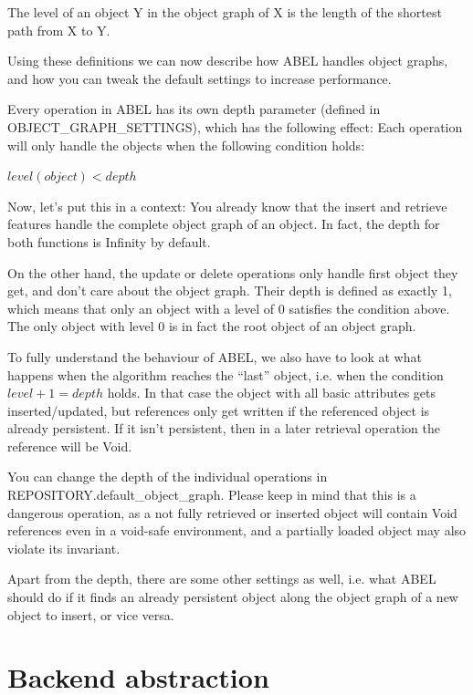 The level of an object Y in the object graph of X is the length of the shortest path from X to Y.

Using these definitions we can now describe how ABEL handles object graphs, and how you can tweak the default settings to increase performance.

Every operation in ABEL has its own depth parameter (defined in OBJECT\_GRAPH\_SETTINGS), which has the following effect:
Each operation will only handle the objects when the following condition holds:

\begin{center}
 $ level(object) < depth $ %
\end{center}

Now, let's put this in a context:
You already know that the insert and retrieve features handle the complete object graph of an object. 
In fact, the depth for both functions is Infinity by default.

On the other hand, the update or delete operations only handle first object they get, and don't care about the object graph.
Their depth is defined as exactly 1, which means that only an object with a level of 0 satisfies the condition above.
The only object with level 0 is in fact the root object of an object graph.

To fully understand the behaviour of ABEL, we also have to look at what happens when the algorithm reaches the ``last'' object, i.e. when the condition $level + 1 = depth$ holds.
In that case the object with all basic attributes gets inserted/updated, but references only get written if the referenced object is already persistent.
If it isn't persistent, then in a later retrieval operation the reference will be Void.

You can change the depth of the individual operations in REPOSITORY.default\_object\_graph. 
Please keep in mind that this is a dangerous operation, as a not fully retrieved or inserted object will contain Void references even in a void-safe environment, and a partially loaded object may also violate its invariant.

Apart from the depth, there are some other settings as well, i.e. what ABEL should do if it finds an already persistent object along the object graph of a new object to insert, or vice versa.

\section{Backend abstraction}

